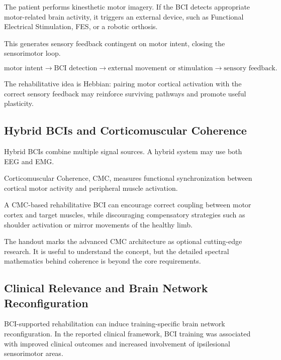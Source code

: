 The patient performs kinesthetic motor imagery. If the BCI detects appropriate motor-related brain activity, it triggers an external device, such as Functional Electrical Stimulation, FES, or a robotic orthosis.

This generates sensory feedback contingent on motor intent, closing the sensorimotor loop.

\[
\text{motor intent}
\rightarrow
\text{BCI detection}
\rightarrow
\text{external movement or stimulation}
\rightarrow
\text{sensory feedback}.
\]

\begin{authornote}
The rehabilitative idea is Hebbian: pairing motor cortical activation with the correct sensory feedback may reinforce surviving pathways and promote useful plasticity.
\end{authornote}

\subsection{Hybrid BCIs and Corticomuscular Coherence}

Hybrid BCIs combine multiple signal sources. A hybrid system may use both EEG and EMG.

Corticomuscular Coherence, CMC, measures functional synchronization between cortical motor activity and peripheral muscle activation.

A CMC-based rehabilitative BCI can encourage correct coupling between motor cortex and target muscles, while discouraging compensatory strategies such as shoulder activation or mirror movements of the healthy limb.

\begin{noexam}
The handout marks the advanced CMC architecture as optional cutting-edge research. It is useful to understand the concept, but the detailed spectral mathematics behind coherence is beyond the core requirements.
\end{noexam}

\subsection{Clinical Relevance and Brain Network Reconfiguration}

BCI-supported rehabilitation can induce training-specific brain network reconfiguration. In the reported clinical framework, BCI training was associated with improved clinical outcomes and increased involvement of ipsilesional sensorimotor areas.

